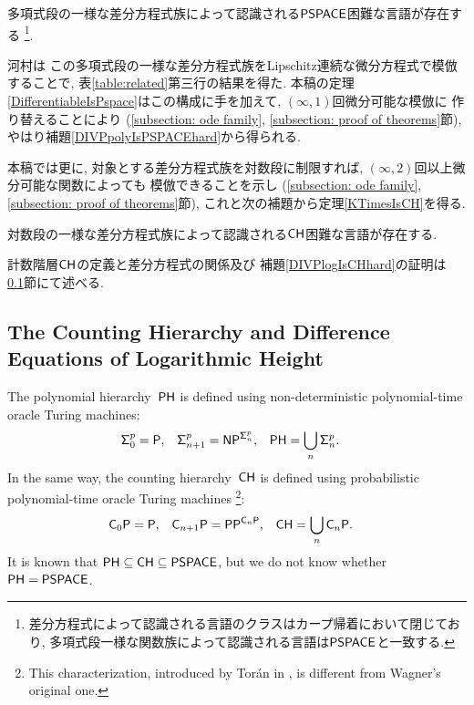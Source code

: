 \begin{lemma}
 \label{DIVPpolyIsPSPACEhard}
 多項式段の一様な差分方程式族によって認識される$\mathsf{PSPACE}$困難な言語が存在する
 \footnote{差分方程式によって認識される言語のクラスはカープ帰着において閉じており,
多項式段一様な関数族によって認識される言語は$\mathsf{PSPACE}$と一致する.}.
\end{lemma}

河村\cite{kawamura2010lipschitz}は
この多項式段の一様な差分方程式族をLipschitz連続な微分方程式で模倣することで, 
表\ref{table:related}第三行の結果を得た. 
本稿の定理\ref{DifferentiableIsPspace}はこの構成に手を加えて, 
$(\infty, 1)$回微分可能な模倣に
作り替えることにより
(\ref{subsection: ode family}, \ref{subsection: proof of theorems}節), 
やはり補題\ref{DIVPpolyIsPSPACEhard}から得られる. 

本稿では更に, 対象とする差分方程式族を対数段に制限すれば, 
$(\infty, 2)$回以上微分可能な関数によっても
模倣できることを示し
(\ref{subsection: ode family}, \ref{subsection: proof of theorems}節), 
これと次の補題から定理\ref{KTimesIsCH}を得る. 

\begin{lemma}
 \label{DIVPlogIsCHhard}
 対数段の一様な差分方程式族によって認識される$\mathsf{CH}$困難な言語が存在する.
\end{lemma}

計数階層$\mathsf{CH}$の定義と差分方程式の関係及び
補題\ref{DIVPlogIsCHhard}の証明は
\ref{subsection: counting hierarchy}節にて述べる.


\subsection{The Counting Hierarchy and Difference Equations of Logarithmic Height}
\label{subsection: counting hierarchy}

The polynomial hierarchy~$\mathsf{PH}$ is defined using non-deterministic polynomial-time oracle Turing machines: 
\begin{align}
 \mathsf{\Sigma}^p_0  &= \mathsf{P},
 &
 \mathsf{\Sigma}^p_{n+1} &= \mathsf{NP} ^{\mathsf{\Sigma}^p_n},
 &
 \mathsf{PH} &= \bigcup_n \mathsf{\Sigma}^p_n.
\end{align}
In the same way, the counting hierarchy~$\mathsf{CH}$
\cite{wagner1986complexity} 
is defined
using probabilistic polynomial-time oracle Turing machines%
\footnote{This characterization, introduced by Tor{\'a}n 
in \cite{toran1991complexity}, is different from Wagner's original one.
}: 
\begin{align} \label{eq:CH}
 \mathsf{C}_0 \mathsf{P}  &= \mathsf{P},
 &
 \mathsf{C}_{n+1} \mathsf{P} &= \mathsf{PP}^{\mathsf{C}_n \mathsf{P}},
 &
 \mathsf{CH} &= \bigcup_n \mathsf{C}_n \mathsf{P}.
\end{align}
It is known that $\mathsf{PH} \subseteq \mathsf{CH} \subseteq \mathsf{PSPACE}$, 
but we do not know whether $\mathsf{PH} = \mathsf{PSPACE}$.


